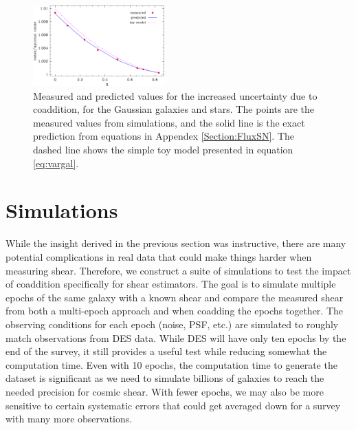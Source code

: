 \documentclass[fleqn,useAMS,usenatbib]{mnras}
\begin{document}
\begin{figure}

\includegraphics[width=0.45\textwidth]{toy-model.png}
\caption{Measured and predicted values for the increased uncertainty due to coaddition, for the Gaussian galaxies and stars.  The points are the measured values from simulations, and the solid line is the exact prediction from equations in Appendex \ref{Section:FluxSN}.  The dashed line shows the simple toy model presented in equation \ref{eq:vargal}.}
\label{fig:mcresults}

\end{figure}



\section{Simulations}
\label{Section:Simulation}


While the insight derived in the previous section was instructive, there are many potential complications in real data that could make things harder when measuring shear.  Therefore, we construct a suite of simulations to test the impact of coaddition specifically for shear estimators.  The goal is to simulate multiple epochs of the same galaxy with a known shear and compare the measured shear from both a multi-epoch approach and when coadding the epochs together.  The observing conditions for each epoch (noise, PSF, etc.) are simulated to roughly match observations from DES data.  While DES will have only ten epochs by the end of the survey, it still provides a useful test while reducing somewhat the computation time.  Even with 10 epochs, the computation time to generate the dataset is significant as we need to simulate billions of galaxies to reach the needed precision for cosmic shear.  With fewer epochs, we may also be more sensitive to certain systematic errors that could get averaged down for a survey with many more observations.
\end{document}
